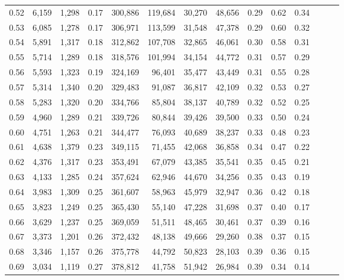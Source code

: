 \begin{tabular}{rrrrrrrrrrrrrr}
0.52 &   6,159 &  1,298 &  0.17 &  300,886 &  119,684 &  30,270 &  48,656 &  0.29 &  0.62 &      0.34 \\
0.53 &   6,085 &  1,278 &  0.17 &  306,971 &  113,599 &  31,548 &  47,378 &  0.29 &  0.60 &      0.32 \\
0.54 &   5,891 &  1,317 &  0.18 &  312,862 &  107,708 &  32,865 &  46,061 &  0.30 &  0.58 &      0.31 \\
0.55 &   5,714 &  1,289 &  0.18 &  318,576 &  101,994 &  34,154 &  44,772 &  0.31 &  0.57 &      0.29 \\
0.56 &   5,593 &  1,323 &  0.19 &  324,169 &   96,401 &  35,477 &  43,449 &  0.31 &  0.55 &      0.28 \\
0.57 &   5,314 &  1,340 &  0.20 &  329,483 &   91,087 &  36,817 &  42,109 &  0.32 &  0.53 &      0.27 \\
0.58 &   5,283 &  1,320 &  0.20 &  334,766 &   85,804 &  38,137 &  40,789 &  0.32 &  0.52 &      0.25 \\
0.59 &   4,960 &  1,289 &  0.21 &  339,726 &   80,844 &  39,426 &  39,500 &  0.33 &  0.50 &      0.24 \\
0.60 &   4,751 &  1,263 &  0.21 &  344,477 &   76,093 &  40,689 &  38,237 &  0.33 &  0.48 &      0.23 \\
0.61 &   4,638 &  1,379 &  0.23 &  349,115 &   71,455 &  42,068 &  36,858 &  0.34 &  0.47 &      0.22 \\
0.62 &   4,376 &  1,317 &  0.23 &  353,491 &   67,079 &  43,385 &  35,541 &  0.35 &  0.45 &      0.21 \\
0.63 &   4,133 &  1,285 &  0.24 &  357,624 &   62,946 &  44,670 &  34,256 &  0.35 &  0.43 &      0.19 \\
0.64 &   3,983 &  1,309 &  0.25 &  361,607 &   58,963 &  45,979 &  32,947 &  0.36 &  0.42 &      0.18 \\
0.65 &   3,823 &  1,249 &  0.25 &  365,430 &   55,140 &  47,228 &  31,698 &  0.37 &  0.40 &      0.17 \\
0.66 &   3,629 &  1,237 &  0.25 &  369,059 &   51,511 &  48,465 &  30,461 &  0.37 &  0.39 &      0.16 \\
0.67 &   3,373 &  1,201 &  0.26 &  372,432 &   48,138 &  49,666 &  29,260 &  0.38 &  0.37 &      0.15 \\
0.68 &   3,346 &  1,157 &  0.26 &  375,778 &   44,792 &  50,823 &  28,103 &  0.39 &  0.36 &      0.15 \\
0.69 &   3,034 &  1,119 &  0.27 &  378,812 &   41,758 &  51,942 &  26,984 &  0.39 &  0.34 &      0.14 \\

\end{tabular}
